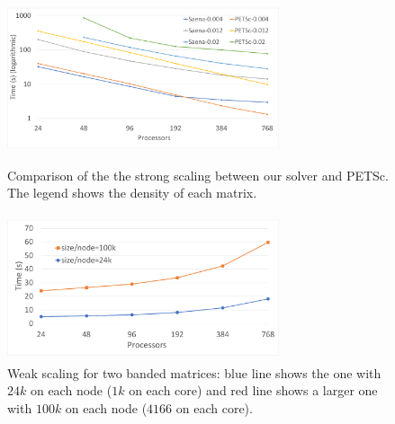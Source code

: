 \begin{figure}[tbh]
    \centering
    \includegraphics[width=8cm,height=5cm]{./figures/strong_size_vs_petsc2.pdf}
    \caption{Comparison of the the strong scaling between our solver and PETSc. The legend shows the density of each matrix.}
    \label{fig:petsc1}
    \Description{}
\end{figure}

\begin{figure}[tbh]
    \centering
    \includegraphics[width=8cm,height=4.3cm]{./figures/weak2.pdf}
    \caption{Weak scaling for two banded matrices: blue line shows the one with $24k$ on each node ($1k$ on each core) and red line shows a larger one with $100k$ on each node ($4166$ on each core).}
    \label{fig:weak1}
    \Description{}
\end{figure}

